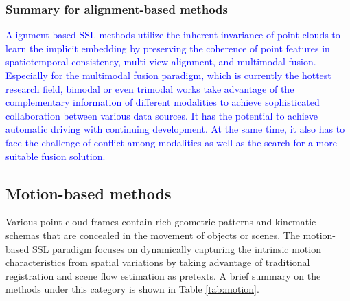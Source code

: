 \documentclass[a4paper,fleqn]{cas-dc}
\begin{document}
\subsubsection{Summary for alignment-based methods}
\textcolor{blue}{
Alignment-based SSL methods utilize the inherent invariance of point clouds to learn the implicit embedding by preserving the coherence of point features in spatiotemporal consistency, multi-view alignment, and multimodal fusion. Especially for the multimodal fusion paradigm, which is currently the hottest research field, bimodal \citep{vora2020pointpainting,wang2021pointaugmenting,li2022deepfusion} or even trimodal \citep{lu2023open,zeng2023clip2,xue2023ulip} works take advantage of the complementary information of different modalities to achieve sophisticated collaboration between various data sources. It has the potential to achieve automatic driving with continuing development. At the same time, it also has to face the challenge of conflict among modalities as well as the search for a more suitable fusion solution.}




\subsection{Motion-based methods}
Various point cloud frames contain rich geometric patterns and kinematic schemas that are concealed in the movement of objects or scenes. The motion-based SSL paradigm focuses on dynamically capturing the intrinsic motion characteristics from spatial variations by taking advantage of traditional registration and scene flow estimation as pretexts. A brief summary on the methods under this category is shown in Table \ref{tab:motion}.
\end{document}
